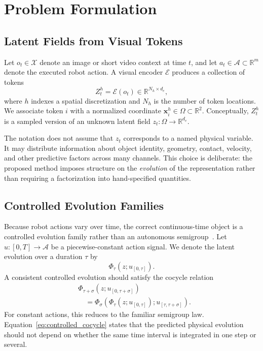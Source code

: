 \documentclass{article}
\theoremstyle{plain}
\theoremstyle{definition}
\theoremstyle{remark}
\newcommand{\R}{\mathbb{R}}
\newcommand{\Xspace}{\mathcal{X}}
\newcommand{\Aspace}{\mathcal{A}}
\newcommand{\PhiOp}{\Phi}
\newcommand{\Enc}{\mathcal{E}}
\begin{document}
\section{Problem Formulation}

\subsection{Latent Fields from Visual Tokens}
Let $o_t\in\Xspace$ denote an image or short video context at time $t$, and let $a_t\in\Aspace\subset\R^m$ denote the executed robot action. A visual encoder $\Enc$ produces a collection of tokens
\begin{equation}
    Z_t^{h}=\Enc(o_t)\in\R^{N_h\times d_e},
    \label{eq:tokens}
\end{equation}
where $h$ indexes a spatial discretization and $N_h$ is the number of token locations. We associate token $i$ with a normalized coordinate $\mathbf{x}_i^{h}\in\Omega\subset\R^2$. Conceptually, $Z_t^h$ is a sampled version of an unknown latent field $z_t:\Omega\rightarrow\R^{d_e}$.

The notation does not assume that $z_t$ corresponds to a named physical variable. It may distribute information about object identity, geometry, contact, velocity, and other predictive factors across many channels. This choice is deliberate: the proposed method imposes structure on the \emph{evolution} of the representation rather than requiring a factorization into hand-specified quantities.

\subsection{Controlled Evolution Families}
Because robot actions vary over time, the correct continuous-time object is a controlled evolution family rather than an autonomous semigroup~\citep{pazy1983semigroups,engel2000semigroups}. Let $u:[0,T]\rightarrow\Aspace$ be a piecewise-constant action signal. We denote the latent evolution over a duration $\tau$ by
\begin{equation}
    \PhiOp_{\tau}(z;u_{[0,\tau]}).
\end{equation}
A consistent controlled evolution should satisfy the cocycle relation
\begin{equation}
\begin{split}
    &\PhiOp_{\tau+\sigma}(z;u_{[0,\tau+\sigma]}) \\
    &\quad=\PhiOp_{\sigma}\!\left(
        \PhiOp_{\tau}(z;u_{[0,\tau]});
        u_{[\tau,\tau+\sigma]}
    \right).
\end{split}
\label{eq:controlled_cocycle}
\end{equation}
For constant actions, this reduces to the familiar semigroup law. Equation~\eqref{eq:controlled_cocycle} states that the predicted physical evolution should not depend on whether the same time interval is integrated in one step or several.
\end{document}
